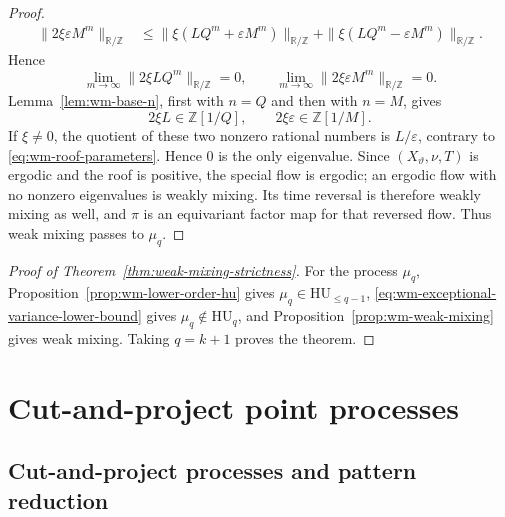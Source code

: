 \documentclass[11pt,reqno,a4paper]{amsart}
\numberwithin{equation}{section}
\theoremstyle{compact}
\theoremstyle{definition}
\theoremstyle{definition}
\newcommand{\HU}{\mathrm{HU}}
\begin{document}
\begin{proof}
\begin{align*}
  \|2\xi\varepsilon M^m\|_{\mathbb R/\mathbb Z}
  &\leq
  \|\xi(LQ^m+\varepsilon M^m)\|_{\mathbb R/\mathbb Z}
  +\|\xi(LQ^m-\varepsilon M^m)\|_{\mathbb R/\mathbb Z}.
\end{align*}
Hence
\begin{equation}\label{eq:wm-eigenvalue-separated-limits}
  \lim_{m\to\infty}\|2\xi LQ^m\|_{\mathbb R/\mathbb Z}=0,
  \qquad
  \lim_{m\to\infty}\|2\xi\varepsilon M^m\|_{\mathbb R/\mathbb Z}=0.
\end{equation}
Lemma~\ref{lem:wm-base-n}, first with $n=Q$ and then with $n=M$, gives
\begin{equation}\label{eq:wm-eigenvalue-arithmetic}
  2\xi L\in\mathbb Z[1/Q],
  \qquad
  2\xi\varepsilon\in\mathbb Z[1/M].
\end{equation}
If $\xi\neq0$, the quotient of these two nonzero rational numbers is
$L/\varepsilon$, contrary to \eqref{eq:wm-roof-parameters}.  Hence $0$ is
the only eigenvalue.  Since $(X_\vartheta,\nu,T)$ is ergodic and the roof is
positive, the special flow is ergodic; an ergodic flow with no nonzero
eigenvalues is weakly mixing.  Its time reversal is therefore weakly mixing
as well, and $\pi$ is an equivariant factor map for that reversed flow.
Thus weak mixing passes to $\mu_q$.
\end{proof}

\begin{proof}[Proof of Theorem~\ref{thm:weak-mixing-strictness}]
For the process $\mu_q$, Proposition~\ref{prop:wm-lower-order-hu} gives
$\mu_q\in\HU_{\leq q-1}$,
\eqref{eq:wm-exceptional-variance-lower-bound} gives
$\mu_q\notin\HU_q$, and Proposition~\ref{prop:wm-weak-mixing} gives weak
mixing.  Taking $q=k+1$ proves the theorem.
\end{proof}


\section{Cut-and-project point processes}
\label{sec:cut-and-project}

\subsection{Cut-and-project processes and pattern reduction}
\label{subsec:cap-pattern-windows}
\end{document}
